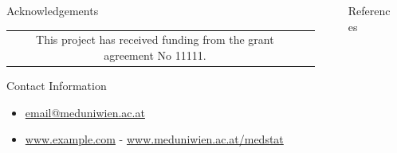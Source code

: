 \documentclass[final]{beamer}
\newlength{\sepmargin}
\newlength{\sepwid}
\newlength{\onecolwid}
\begin{document}
\begin{frame}[t]
\begin{columns}[t]
\begin{column}{\onecolwid}
\begin{block}{ }
		\end{block}
      \end{column}
      
      \begin{column}{\sepmargin} \end{column}
      \end{columns} 
       
      \begin{columns}[t] %
      
      \begin{column}{\sepmargin} \end{column}
        \begin{column}{\onecolwid} %
			\begin{block}{\large Acknowledgements}
                    \begin{center}
						\begin{tabular}{SL}
							\footnotesize This project has received funding from the  grant agreement No 11111.
						\end{tabular}
					\end{center}
				\end{block}	
                \vspace*{-0.9cm}
				\begin{alertblock}{\large Contact Information}
                \vspace*{-0.5cm}
					\begin{footnotesize}
					\begin{itemize}
						\item \href{mailto:email@meduniwien.ac.at}{email@meduniwien.ac.at}
						\item \href{http://www.example.com/}{www.example.com} - \href{www.meduniwien.ac.at/medstat}{www.meduniwien.ac.at/medstat}
					\end{itemize}
					\end{footnotesize}	
					
				\end{alertblock}
		    \end{column} %
			\begin{column}{\sepwid}\end{column} %
			\begin{column}{\onecolwid} %
              \begin{block}{\large References}
			  \vspace*{-0.5cm}
              	\nocite{*} %
					{\footnotesize
						}
				\end{block} 
			\end{column} %
            

\end{columns}
\end{frame}
\end{document}

